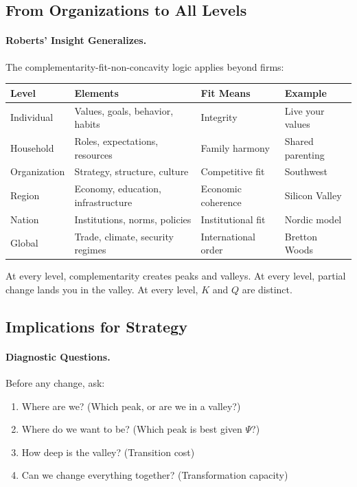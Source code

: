 \documentclass[12pt,a4paper]{article}
\begin{document}
\subsection{From Organizations to All Levels}

\paragraph{Roberts' Insight Generalizes.}
The complementarity-fit-non-concavity logic applies beyond firms:

\begin{center}
\renewcommand{\arraystretch}{1.3}
\begin{tabular}{llll}
\hline
\textbf{Level} & \textbf{Elements} & \textbf{Fit Means} & \textbf{Example} \\
\hline
Individual & Values, goals, behavior, habits & Integrity & Live your values \\
Household & Roles, expectations, resources & Family harmony & Shared parenting \\
Organization & Strategy, structure, culture & Competitive fit & Southwest \\
Region & Economy, education, infrastructure & Economic coherence & Silicon Valley \\
Nation & Institutions, norms, policies & Institutional fit & Nordic model \\
Global & Trade, climate, security regimes & International order & Bretton Woods \\
\hline
\end{tabular}
\end{center}

At every level, complementarity creates peaks and valleys.
At every level, partial change lands you in the valley.
At every level, $K$ and $Q$ are distinct.

\subsection{Implications for Strategy}

\paragraph{Diagnostic Questions.}
Before any change, ask:
\begin{enumerate}
  \item Where are we? (Which peak, or are we in a valley?)
  \item Where do we want to be? (Which peak is best given $\Psi$?)
  \item How deep is the valley? (Transition cost)
  \item Can we change everything together? (Transformation capacity)
\end{enumerate}
\end{document}
